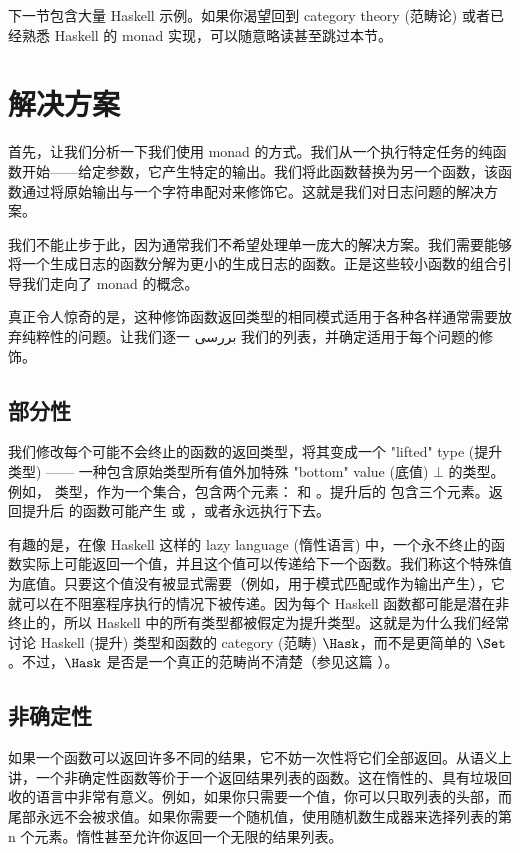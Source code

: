 下一节包含大量 Haskell 示例。如果你渴望回到 category theory (范畴论) 或者已经熟悉 Haskell 的 monad 实现，可以随意略读甚至跳过本节。

\section{解决方案}

首先，让我们分析一下我们使用  monad 的方式。我们从一个执行特定任务的纯函数开始——给定参数，它产生特定的输出。我们将此函数替换为另一个函数，该函数通过将原始输出与一个字符串配对来修饰它。这就是我们对日志问题的解决方案。

我们不能止步于此，因为通常我们不希望处理单一庞大的解决方案。我们需要能够将一个生成日志的函数分解为更小的生成日志的函数。正是这些较小函数的组合引导我们走向了 monad 的概念。

真正令人惊奇的是，这种修饰函数返回类型的相同模式适用于各种各样通常需要放弃纯粹性的问题。让我们逐一 بررسی 我们的列表，并确定适用于每个问题的修饰。

\subsection{部分性}

我们修改每个可能不会终止的函数的返回类型，将其变成一个 "lifted" type (提升类型) —— 一种包含原始类型所有值外加特殊 "bottom" value (底值) $\bot$ 的类型。例如， 类型，作为一个集合，包含两个元素： 和 。提升后的  包含三个元素。返回提升后  的函数可能产生  或 ，或者永远执行下去。

有趣的是，在像 Haskell 这样的 lazy language (惰性语言) 中，一个永不终止的函数实际上可能返回一个值，并且这个值可以传递给下一个函数。我们称这个特殊值为底值。只要这个值没有被显式需要（例如，用于模式匹配或作为输出产生），它就可以在不阻塞程序执行的情况下被传递。因为每个 Haskell 函数都可能是潜在非终止的，所以 Haskell 中的所有类型都被假定为提升类型。这就是为什么我们经常讨论 Haskell (提升) 类型和函数的 category (范畴) $\Hask$，而不是更简单的 $\Set$。不过，$\Hask$ 是否是一个真正的范畴尚不清楚（参见这篇 ）。

\subsection{非确定性}

如果一个函数可以返回许多不同的结果，它不妨一次性将它们全部返回。从语义上讲，一个非确定性函数等价于一个返回结果列表的函数。这在惰性的、具有垃圾回收的语言中非常有意义。例如，如果你只需要一个值，你可以只取列表的头部，而尾部永远不会被求值。如果你需要一个随机值，使用随机数生成器来选择列表的第 n 个元素。惰性甚至允许你返回一个无限的结果列表。

